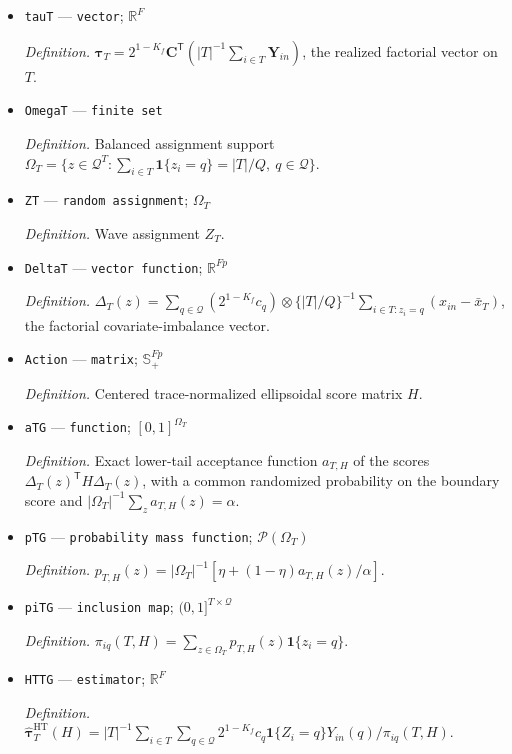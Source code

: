 \documentclass{article}
\begin{document}
\begin{itemize}
  \item \texttt{tauT} --- \texttt{vector}; \(\mathbb R^{F}\)
  \par\smallskip\noindent\emph{Definition.} \(\boldsymbol\tau_T=2^{1-K_f}\mathbf C^{\mathsf T}(|T|^{-1}\sum_{i\in T}\mathbf Y_{in})\), the realized factorial vector on \(T\).
  \item \texttt{OmegaT} --- \texttt{finite set}
  \par\smallskip\noindent\emph{Definition.} Balanced assignment support \(\Omega_T=\{z\in\mathcal Q^{T}:\sum_{i\in T}\mathbf 1\{z_i=q\}=|T|/Q,\ q\in\mathcal Q\}\).
  \item \texttt{ZT} --- \texttt{random assignment}; \(\Omega_T\)
  \par\smallskip\noindent\emph{Definition.} Wave assignment \(Z_T\).
  \item \texttt{DeltaT} --- \texttt{vector function}; \(\mathbb R^{Fp}\)
  \par\smallskip\noindent\emph{Definition.} \(\Delta_T(z)=\sum_{q\in\mathcal Q}(2^{1-K_f}c_q)\otimes\{|T|/Q\}^{-1}\sum_{i\in T:z_i=q}(x_{in}-\bar x_T)\), the factorial covariate-imbalance vector.
  \item \texttt{Action} --- \texttt{matrix}; \(\mathbb S_{+}^{Fp}\)
  \par\smallskip\noindent\emph{Definition.} Centered trace-normalized ellipsoidal score matrix \(H\).
  \item \texttt{aTG} --- \texttt{function}; \([0,1]^{\Omega_T}\)
  \par\smallskip\noindent\emph{Definition.} Exact lower-tail acceptance function \(a_{T,H}\) of the scores \(\Delta_T(z)^{\mathsf T}H\Delta_T(z)\), with a common randomized probability on the boundary score and \(|\Omega_T|^{-1}\sum_z a_{T,H}(z)=\alpha\).
  \item \texttt{pTG} --- \texttt{probability mass function}; \(\mathcal P(\Omega_T)\)
  \par\smallskip\noindent\emph{Definition.} \(p_{T,H}(z)=|\Omega_T|^{-1}[\eta+(1-\eta)a_{T,H}(z)/\alpha]\).
  \item \texttt{piTG} --- \texttt{inclusion map}; \((0,1]^{T\times\mathcal Q}\)
  \par\smallskip\noindent\emph{Definition.} \(\pi_{iq}(T,H)=\sum_{z\in\Omega_T}p_{T,H}(z)\mathbf 1\{z_i=q\}\).
  \item \texttt{HTTG} --- \texttt{estimator}; \(\mathbb R^{F}\)
  \par\smallskip\noindent\emph{Definition.} \(\widehat{\boldsymbol\tau}^{\mathrm{HT}}_T(H)=|T|^{-1}\sum_{i\in T}\sum_{q\in\mathcal Q}2^{1-K_f}c_q\mathbf 1\{Z_i=q\}Y_{in}(q)/\pi_{iq}(T,H)\).

\end{itemize}
\end{document}
